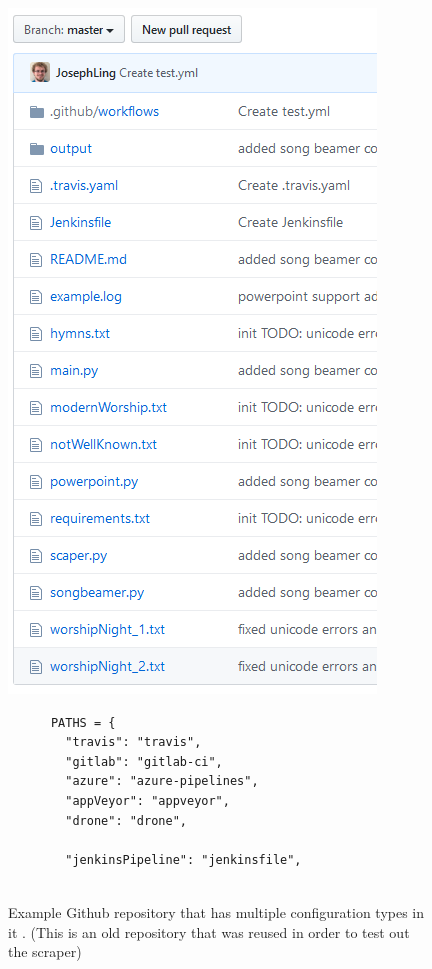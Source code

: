 \documentclass[10pt,conference]{IEEEtran}
\begin{document}
\begin{figure}[!htbp]
  \centering
  \begin{minipage}{.48\textwidth}
    \centering
    \includegraphics[scale=0.5]{repository file system.png}
    
    \caption[alt text]{Example Github repository that has multiple configuration types in it \cite{GithubRepoExample}. (This is an old repository that was reused in order to test out the scraper)}
    \label{image_example_repo}
  \end{minipage}%
  \hfill
  \begin{minipage}{.48\textwidth}
    \begin{verbatim}
      PATHS = {
        "travis": "travis",
        "gitlab": "gitlab-ci",
        "azure": "azure-pipelines",
        "appVeyor": "appveyor",
        "drone": "drone",
    
        "jenkinsPipeline": "jenkinsfile",
        

\end{verbatim}
\end{minipage}
\end{figure}
\end{document}
